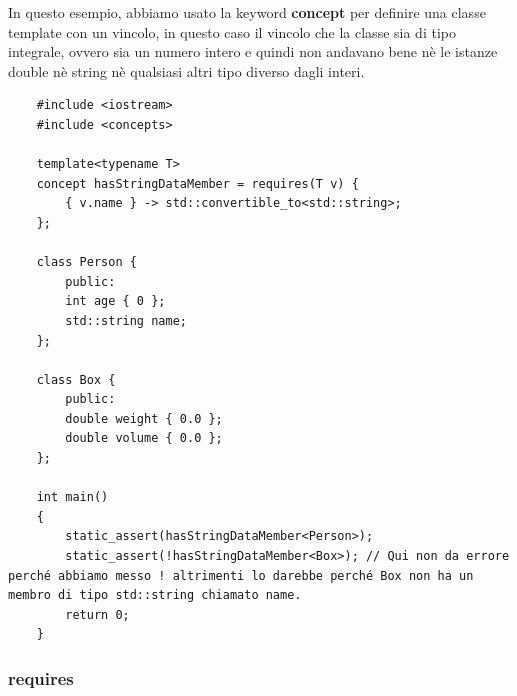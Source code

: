 \textsf{\small In questo esempio, abbiamo usato la keyword \textbf{concept} per definire una classe template con un vincolo, in questo caso il vincolo che la classe sia di tipo integrale, ovvero sia un numero intero e quindi non andavano bene nè le istanze double nè string nè qualsiasi altri tipo diverso dagli interi.} \\

\begin{lstlisting}
	#include <iostream>
	#include <concepts>
	
	template<typename T>
	concept hasStringDataMember = requires(T v) { 
		{ v.name } -> std::convertible_to<std::string>; 
	};
	
	class Person {
		public:
		int age { 0 };
		std::string name;
	};
	
	class Box {
		public:
		double weight { 0.0 };
		double volume { 0.0 };
	};
	
	int main()
	{
		static_assert(hasStringDataMember<Person>);
		static_assert(!hasStringDataMember<Box>); // Qui non da errore perché abbiamo messo ! altrimenti lo darebbe perché Box non ha un membro di tipo std::string chiamato name.
		return 0;
	}
\end{lstlisting}

\subsubsection{requires}

